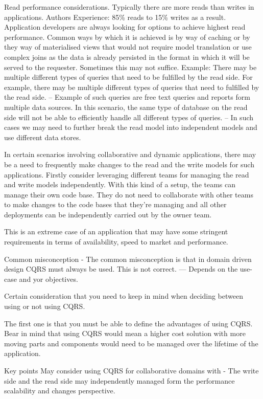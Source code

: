 \documentclass[a4paper, 11pt]{book}
\begin{document}
    Read performance considerations.
    Typically there are more reads than writes in applications.
    Authors Experience: 85\% reads to 15\% writes as a result.
    Application developers are always looking for options to achieve highest read performance.
    Common ways by which it is achieved is by way of caching or by they way of materialised views that would not require model translation or use complex joins as the data is already persisted in the format in which it will be served to the requester.
    Sometimes this may not suffice.
    Example:
    There may be multiple different types of queries that need to be fulfilled by the read side.
    For example, there may be multiple different types of queries that need to fulfilled by the read side.
    -- Example of such queries are free text queries and reports form multiple data sources.
    In this scenario, the same type of database on the read side will not be able to efficiently handle all different types of queries.
    -- In such cases we may need to further break the read model into independent models and use different data stores.

    In certain scenarios involving collaborative and dynamic applications, there may be a need to frequently make changes to the read and the write models for such applications.
    Firstly consider leveraging different teams for managing the read and write models independently.
    With this kind of a setup, the teams can manage their own code base.
    They do not need to collaborate with other teams to make changes to the code bases that they're managing and all other deployments can be independently carried out by the owner team.

    This is an extreme case of an application that may have some stringent requirements in terms of availability, speed to market and performance.

    Common misconception
    - The common misconception is that in domain driven design CQRS must always be used. This is not correct.
    --- Depends on the use-case and yor objectives.

    Certain consideration that you need to keep in mind when deciding between using or not using CQRS.

    The first one is that you must be able to define the advantages of using CQRS.
    Bear in mind that using CQRS would mean a higher cost solution with more moving parts and components would need to be managed over the lifetime of the application.

    Key points
    May consider using CQRS for collaborative domains with
    - The write side and the read side may independently managed form the performance scalability and changes perspective.
\end{document}
